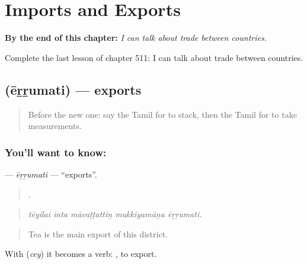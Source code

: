 
\chapter{Imports and Exports}
\label{ch:ta-imports-and-exports}

\begin{chapteropening}
\textbf{By the end of this chapter:} \emph{I can talk about trade between countries.}

Complete the last lesson of chapter 511: I can talk about trade between countries.
\end{chapteropening}

\section[\texorpdfstring{\ta{ஏற்றுமதி} (ēṟṟumati)}{ஏற்றுமதி (ēṟṟumati)}]{ (ēṟṟumati) — exports}

\label{lesson:TA-C511-errumati}



\begin{quote}
Before the new one: say the Tamil for to stack, then the Tamil for to take measurements.
\end{quote}

\subsection*{You'll want to know: }
\textbf{} — \emph{ēṟṟumati} — \textquotedblleft{}exports\textquotedblright{}.

\begin{quote}
    .
\end{quote}

\begin{quote}
\emph{tēyilai inta māvaṭṭattiṉ mukkiyamāṉa ēṟṟumati.}
\end{quote}

\begin{quote}
Tea is the main export of this district.
\end{quote}

With  (\emph{cey}) it becomes a verb:  , to export.

